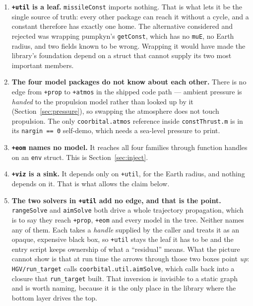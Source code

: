 \documentclass[11pt]{article}
\newcommand{\code}[1]{\texttt{#1}}
\newcommand{\pkg}[1]{\texttt{+#1}}
\begin{document}
\begin{enumerate}
\item \textbf{\pkg{util} is a leaf.} \code{missileConst} imports nothing. That
is what lets it be the single source of truth: every other package can reach it
without a cycle, and a constant therefore has exactly one home. The alternative
considered and rejected was wrapping pumpkyn's \code{getConst}, which has no
\code{muE}, no Earth radius, and two fields known to be wrong. Wrapping it
would have made the library's foundation depend on a struct that cannot supply
its two most important members.

\item \textbf{The four model packages do not know about each other.} There is
no edge from \pkg{prop} to \pkg{atmos} in the shipped code path --- ambient
pressure is \emph{handed} to the propulsion model rather than looked up by it
(Section~\ref{sec:pressure}), so swapping the atmosphere does not touch
propulsion. The only \code{coorbital.atmos} reference inside
\code{constThrust.m} is in its \code{nargin == 0} self-demo, which needs a
sea-level pressure to print.

\item \textbf{\pkg{eom} names no model.} It reaches all four families through
function handles on an \code{env} struct. This is Section~\ref{sec:inject}.

\item \textbf{\pkg{viz} is a sink.} It depends only on \pkg{util}, for the
Earth radius, and nothing depends on it. That is what allows the claim below.

\item \textbf{The two solvers in \pkg{util} add no edge, and that is the
point.} \code{rangeSolve} and \code{aimSolve} both drive a whole trajectory
propagation, which is to say they reach \pkg{prop}, \pkg{eom} and every model
in the tree. Neither names any of them. Each takes a \emph{handle} supplied by
the caller and treats it as an opaque, expensive black box, so \pkg{util}
stays the leaf it has to be and the entry script keeps ownership of what a
``residual'' means. What the picture cannot show is that at run time the
arrows through those two boxes point \emph{up}: \code{HGV/run\_target} calls
\code{coorbital.util.aimSolve}, which calls back into a closure that
\code{run\_target} built. That inversion is invisible to a static graph and is
worth naming, because it is the only place in the library where the bottom
layer drives the top.
\end{enumerate}
\end{document}
